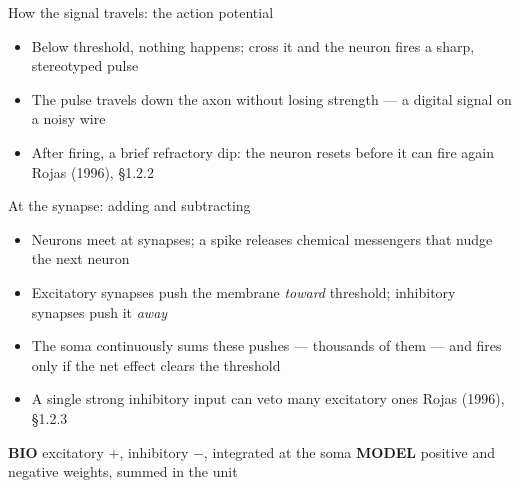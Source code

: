 \documentclass[aspectratio=169, 11pt]{beamer}
\newcommand{\biomodel}[2]{%
  \vfill
  {\footnotesize
  \begin{tcolorbox}[enhanced, sidebyside, sidebyside align=top,
                    lefthand ratio=0.485,
                    segmentation style={bioc!35, line width=0.6pt},
                    colback=bioc!5, colframe=bioc!35, boxrule=0.5pt,
                    arc=1.5mm, left=2mm, right=2mm, top=0.8mm, bottom=0.8mm]
    {\color{bioc}\textbf{BIO}}\;\; #1
  \tcblower
    {\color{modc}\textbf{MODEL}}\;\; #2
  \end{tcolorbox}}%
  \vspace{0.6em}%
}
\newcommand{\src}[3]{}      %
\begin{document}
\begin{frame}{How the signal travels: the action potential}
  \src{rojas1996}{section}{1.2.2}
  \src{chakravarthy2012}{section}{1.1.5.3}
  \src{chakravarthy2012}{section}{1.1.5.2}
  \centering
  \vspace{0.1em}
  \begin{itemize}\setlength{\itemsep}{0pt}
    \item Below threshold, nothing happens; \alert{cross it}
          and the neuron fires a sharp, stereotyped pulse
    \item The pulse travels down the axon \alert{without
          losing strength} --- a digital signal on a noisy wire
    \item After firing, a brief \alert{refractory} dip: the
          neuron resets before it can fire again
          \hfill{\scriptsize Rojas (1996), \S1.2.2}
  \end{itemize}
\end{frame}

\begin{frame}{At the synapse: adding and subtracting}
  \src{rojas1996}{section}{1.2.3}
  \begin{itemize}
    \item Neurons meet at \alert{synapses}; a spike releases
          chemical messengers that nudge the next neuron
    \item \alert{Excitatory} synapses push the membrane
          \emph{toward} threshold; \alert{inhibitory} synapses
          push it \emph{away}
    \item The soma continuously \alert{sums} these pushes ---
          thousands of them --- and fires only if the net
          effect clears the threshold
    \item A single strong inhibitory input can \alert{veto}
          many excitatory ones
          \hfill{\scriptsize Rojas (1996), \S1.2.3}
  \end{itemize}
  \biomodel{excitatory $+$, inhibitory $-$, integrated at the
            soma}
           {positive and negative \alert{weights}, summed in
            the unit}
\end{frame}
\end{document}
